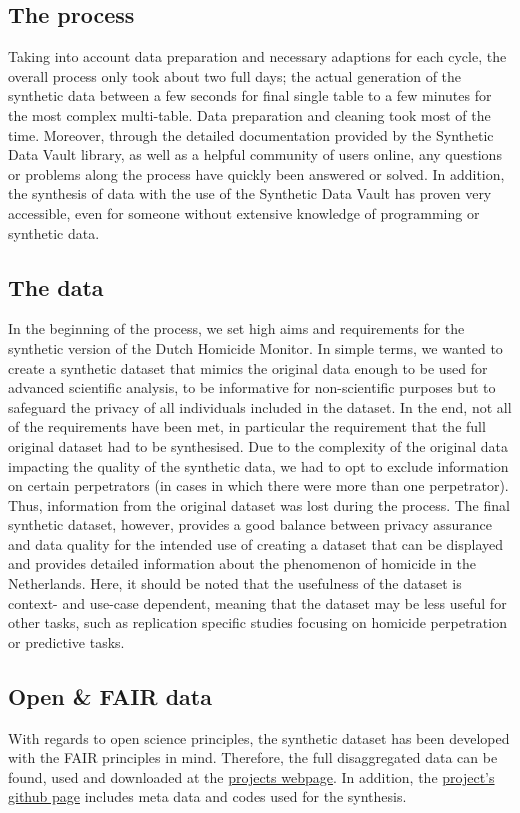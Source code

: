 \subsection{The process}
Taking into account data preparation and necessary adaptions for each cycle, the overall process only took about two full days; the actual generation of the synthetic data between a few seconds for final single table to a few minutes for the most complex multi-table. Data preparation and cleaning took most of the time. Moreover, through the detailed documentation provided by the Synthetic Data Vault library, as well as a helpful community of users online, any questions or problems along the process have quickly been answered or solved. In addition, the synthesis of data with the use of the Synthetic Data Vault has proven very accessible, even for someone without extensive knowledge of programming or synthetic data. 

\subsection{The data}
In the beginning of the process, we set high aims and requirements for the synthetic version of the Dutch Homicide Monitor. In simple terms, we wanted to create a synthetic dataset that mimics the original data enough to be used for advanced scientific analysis, to be informative for non-scientific purposes but to safeguard the privacy of all individuals included in the dataset. In the end, not all of the requirements have been met, in particular the requirement that the full original dataset had to be synthesised. Due to the complexity of the original data impacting the quality of the synthetic data, we had to opt to exclude information on certain perpetrators (in cases in which there were more than one perpetrator). Thus, information from the original dataset was lost during the process. The final synthetic dataset, however, provides a good balance between privacy assurance and data quality for the intended use of creating a dataset that can be displayed and provides detailed information about the phenomenon of homicide in the Netherlands. Here, it should be noted that the usefulness of the dataset is context- and use-case dependent, meaning that the dataset may be less useful for other tasks, such as replication specific studies focusing on homicide perpetration or predictive tasks.

\subsection{Open \& FAIR data}
With regards to open science principles, the synthetic dataset has been developed with the FAIR principles in mind. Therefore, the full disaggregated data can be found, used and downloaded at the \href{https://www.dutchhomicide.streamlit.io}{projects webpage}. In addition, the \href{https://github.com/KKrusselmann/SENSYN}{project's github page} includes meta data and codes used for the synthesis. 





